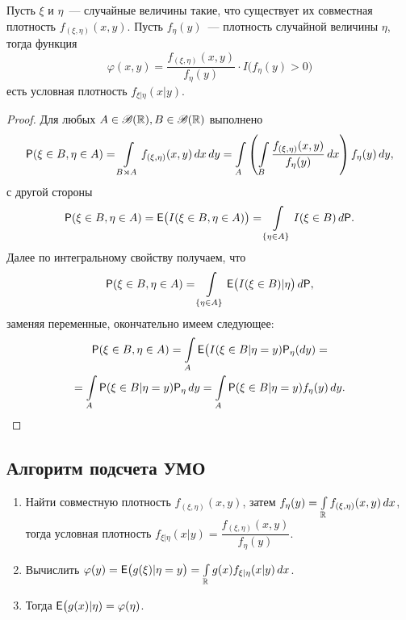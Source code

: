  \begin{theorem}
 	Пусть $\xi$ и $\eta$~--- случайные величины такие, что существует их совместная 
 	плотность $f_{(\xi, \eta)} (x, y)$. Пусть $f_\eta (y)$~--- плотность случайной 
 	величины $\eta$, тогда функция 
 	$$\varphi(x, y) = 
 	\dfrac{f_{(\xi, \eta)} (x, y)}{f_\eta (y)} \cdot I \big(f_\eta(y) > 0 \big)$$ 
 	есть условная плотность $f_{\xi |\eta} (x | y)$.
 	\begin{proof}
 		Для любых $A \in \B(\R), B \in \B(\R)$ выполнено
 		\begin{multline*}
 			\P(\xi \in B, \eta \in A) = 
 			\int\limits_{B \rtimes A} f_{(\xi, \eta)} (x, y) \, dx \, dy = 
 			\int\limits_A \left( \int\limits_B \dfrac{f_{(\xi, \eta)} 
 			(x, y)}{f_\eta(y)} \, dx \right) f_\eta(y) \, dy,
 		\end{multline*}
 		с другой стороны
 		\begin{equation*}
 			\P( \xi \in B, \eta \in A) = \E \big( I (\xi \in B, \eta \in A) \big) = 
 			\int\limits_{\{\eta \in A \}} I(\xi \in B) \, d\P.
 		\end{equation*}
 		Далее по интегральному свойству получаем, что
 		\begin{equation*}
 			\P( \xi \in B, \eta \in A) = 
 			\int\limits_{\{\eta \in A \}} \E  \big( I(\xi \in B) | \eta \big) \, d\P,
 		\end{equation*}
 		заменяя переменные, окончательно имеем следующее:
 		\begin{multline*}
 			\P( \xi \in B, \eta \in A) = 
 			\int\limits_A \E \big( I (\xi \in B | \eta = y) \P_\eta(d y) =\\ 
 			= \int\limits_A \P(\xi \in B | \eta = y) \P_\eta \, dy = 
 			\int\limits_A \P( \xi \in B | \eta = y) f_\eta (y) \, dy.
 		\end{multline*}
 	\end{proof}
 \end{theorem}
 \subsection*{Алгоритм подсчета УМО}
 \begin{enumerate}
 	\item {Найти совместную плотность $f_{(\xi, \eta)} (x, y)$, затем 
 		$f_\eta (y) = \int\limits_\R f_{(\xi, \eta)} (x, y) \, dx$, тогда условная
 	 	плотность $f_{ \xi | \eta } (x | y) = \dfrac{f_{(\xi, \eta)} (x, y)}{f_\eta (y)}$.}
 	\item {Вычислить $\varphi(y) = \E \big( g(\xi) | \eta = y \big) = 
 		\int\limits_\R g(x) f_{ \xi | \eta } (x | y) \, dx $.}
 	\item {Тогда $\E  \big( g(x) | \eta) = \varphi(\eta)$.}
 \end{enumerate}
